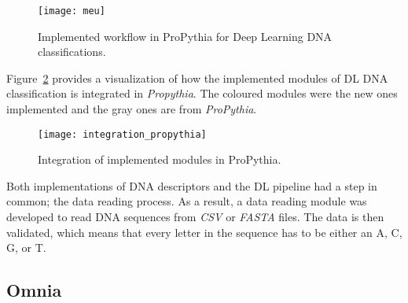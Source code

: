 \begin{figure}[htbp]
    \centering
    \texttt{[image: meu]}
    \caption{Implemented workflow in ProPythia for Deep Learning DNA classifications.}
    \label{fig:meu}
\end{figure}

Figure~\ref{fig:integration_propythia} provides a visualization of how the implemented modules of \gls{DL} \gls{DNA} classification is integrated in \textit{Propythia}. The coloured modules were the new ones implemented and the gray ones are from \textit{ProPythia}.

\begin{figure}[htbp]
    \centering
    \texttt{[image: integration\_propythia]}
    \caption{Integration of implemented modules in ProPythia.}
    \label{fig:integration_propythia}
\end{figure}

Both implementations of \gls{DNA} descriptors and the \gls{DL} pipeline had a step in common; the data reading process. As a result, a data reading module was developed to read \gls{DNA} sequences from \textit{CSV} or \textit{FASTA} files. The data is then validated, which means that every letter in the sequence has to be either an \gls{A}, \gls{C}, \gls{G}, or \gls{T}.

\subsection{Omnia}





